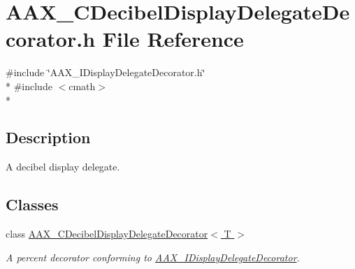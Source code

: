 \hypertarget{a00169}{}\section{A\+A\+X\+\_\+\+C\+Decibel\+Display\+Delegate\+Decorator.\+h File Reference}
\label{a00169}
{\ttfamily \#include \char`\"{}A\+A\+X\+\_\+\+I\+Display\+Delegate\+Decorator.\+h\char`\"{}}\\*
{\ttfamily \#include $<$cmath$>$}\\*


\subsection{Description}
A decibel display delegate. 

\subsection*{Classes}
\begin{DoxyCompactItemize}
\item 
class \hyperlink{a00015}{A\+A\+X\+\_\+\+C\+Decibel\+Display\+Delegate\+Decorator$<$ T $>$}
\begin{DoxyCompactList}\small\item\em A percent decorator conforming to \hyperlink{a00094}{A\+A\+X\+\_\+\+I\+Display\+Delegate\+Decorator}. \end{DoxyCompactList}\end{DoxyCompactItemize}
